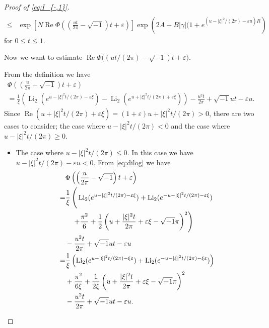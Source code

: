 \documentclass[a4paper]{amsart}
\theoremstyle{plain}
\theoremstyle{definition}
\theoremstyle{remark}
\newcommand{\Li}{\operatorname{Li}}
\renewcommand{\Re}{\operatorname{Re}}
\numberwithin{equation}{section}
\begin{document}
\begin{proof}[Proof of \eqref{eq:I_{-,1}}]
\begin{equation}
\begin{split}
  \\
  \le&
  \exp
  \left[
    N\Re\Phi\left(\left(\frac{ut}{2\pi}-\sqrt{-1}\right)t+\varepsilon\right)
  \right]
  \exp\left(2A+B|\gamma|(1+e^{(u-|\xi|^2/(2\pi)-\varepsilon u)R}\right)
\end{split}
\end{equation}
for $0\le t\le1$.
\par
Now we want to estimate $\Re\Phi\bigl((ut/(2\pi)-\sqrt{-1})t+\varepsilon\bigr)$.
\par
From the definition we have
\begin{multline*}
  \Phi\left(\left(\frac{u}{2\pi}-\sqrt{-1}\right)t+\varepsilon\right)
  \\
  =
  \frac{1}{\xi}
  \left(
    \Li_2(e^{u-|\xi|^2t/(2\pi)-\varepsilon\xi})
    -
    \Li_2(e^{u+|\xi|^2t/(2\pi)+\varepsilon\xi})
  \right)
  -\frac{u^2t}{2\pi}+\sqrt{-1}ut-\varepsilon u.
\end{multline*}
Since $\Re(u+|\xi|^2t/(2\pi)+\varepsilon\xi)=(1+\varepsilon)u+|\xi|^2t/(2\pi)>0$, there are two cases to consider; the case where $u-|\xi|^2t/(2\pi)<0$ and the case where $u-|\xi|^2t/(2\pi)\ge0$.
\begin{itemize}
\item The case where $u-|\xi|^2t/(2\pi)\le0$.
In this case we have $u-|\xi|^2t/(2\pi)-\varepsilon u<0$.
From \eqref{eq:dilog} we have
\begin{equation*}
\begin{split}
  &\Phi\left(\left(\frac{u}{2\pi}-\sqrt{-1}\right)t+\varepsilon\right)
  \\
  =&
  \frac{1}{\xi}
  \left(\vphantom{
          \left(u+\frac{|\xi|^2t}{2\pi}-\varepsilon\xi+\sqrt{-1}\pi\right)^2}
    \Li_2(e^{u-|\xi|^2t/(2\pi)-\varepsilon\xi})
    +
    \Li_2(e^{-u-|\xi|^2t/(2\pi)-\varepsilon\xi})
  \right.
  \\
  &
  \left.\quad
    +\frac{\pi^2}{6}
    +\frac{1}{2}
    \left(
      u+\frac{|\xi|^2t}{2\pi}+\varepsilon\xi-\sqrt{-1}\pi
    \right)^2
  \right)
  \\
  &-\frac{u^2t}{2\pi}+\sqrt{-1}ut-\varepsilon u
  \\
  =&
  \frac{1}{\xi}
  \left(
    \Li_2(e^{u-|\xi|^2t/(2\pi)-\xi\varepsilon})
    +
    \Li_2(e^{-u-|\xi|^2t/(2\pi)-\xi\varepsilon})
  \right)
  \\
  &+\frac{\pi^2}{6\xi}
  +\frac{1}{2\xi}
  \left(
    u+\frac{|\xi|^2t}{2\pi}+\varepsilon\xi-\sqrt{-1}\pi
  \right)^2
  \\
  &-\frac{u^2t}{2\pi}+\sqrt{-1}ut-\varepsilon u.
\end{split}

\end{equation*}
\end{itemize}
\end{proof}
\end{document}
